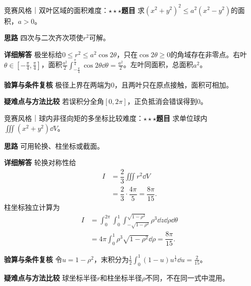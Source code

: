 \begin{example}{竞赛风格｜双叶区域的面积}{难度：$\star\star\star$}\label{ic:ex:delta_multiple:lemniscate}\textbf{题目} 求$(x^2+y^2)^2\le a^2(x^2-y^2)$的面积，$a>0$。\par \textbf{思路} 四次与二次齐次项使$r^2$可解。\par \textbf{详细解答} 极坐标给$0\le r^2\le a^2\cos2\theta$，只在$\cos2\theta\ge0$的角域存在非零点。右叶$\theta\in[-\frac{\pi}{4},\frac{\pi}{4}]$，面积$\frac{a^2}2\int_{-\frac{\pi}{4}}^{\frac{\pi}{4}}\cos2\theta\dd\theta=\frac{a^2}{2}$。左叶同面积，总面积$a^2$。\par \textbf{验算与条件复核} 极径上界在两端为0，且两叶只在原点接触，面积可相加。\par \textbf{疑难点与方法比较} 若误积分全角$[0,2\pi]$，正负抵消会错误得到0。\end{example}

\begin{example}{竞赛风格｜球内非径向矩的多坐标比较}{难度：$\star\star\star$}\label{ic:ex:delta_multiple:triplefourways}\textbf{题目} 求单位球内$\iiint(x^2+y^2)\dd V$。\par \textbf{思路} 可用轮换、柱坐标或截面。\par \textbf{详细解答} 轮换对称性给
\[\begin{aligned}
 I&=\dfrac23\iiint r^2\dd V\\
  &=\dfrac23\cdot\dfrac{4\pi}{5}=\dfrac{8\pi}{15}.
\end{aligned}\]
柱坐标独立计算为
\[\begin{aligned}
 I&=\int_0^{2\pi}\int_0^1\int_{-\sqrt{1-\rho^2}}^{\sqrt{1-\rho^2}}
       \rho^3\dd z\dd\rho\dd\theta\\
  &=4\pi\int_0^1\rho^3\sqrt{1-\rho^2}\dd\rho
   =\dfrac{8\pi}{15}.
\end{aligned}\]\par \textbf{验算与条件复核} 令$u=1-\rho^2$，末积分为$\frac12\int_0^1(1-u)u^{\frac{1}{2}}\dd u=\frac{2}{15}$。\par \textbf{疑难点与方法比较} 球坐标半径$r$和柱坐标半径$\rho$不同，不在同一式中混用。\end{example}
